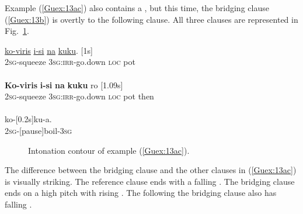 \documentclass[output=paper]{LSP/langsci}
\begin{document}
Example (\ref{Guex:13ac}) also contains a , but this time, the bridging clause (\ref{Guex:13b}) is overtly  to the following clause. All three clauses are represented in Fig.~\ref{GuF3}. 

\begin{exe}
\ex \label{Guex:13ac}
\begin{xlist}
\ex \label{Guex:13a}
\gll \underline{ko-viris}          \underline{i-si}                 \underline{na}     \underline{kuku}. [1s]\\
\textsc{2sg}-squeeze     \textsc{3sg:irr-}go.down   \textsc{loc}    pot \\
\glt {}\\
\ex \label{Guex:13b}
\gll \textbf{Ko-viris}          \textbf{i-si}               \textbf{na}    \textbf{kuku}   ro [1.09s] \\
\textsc{2sg}-squeeze     \textsc{3sg:irr-}go.down   \textsc{loc}    pot then\\
\glt {}\\
\ex \label{Guex:13c}
\gll   ko-[0.2s]ku-a.\\     	       
\textsc{2sg}-[pause]boil-\textsc{3sg}\\
\glt {} 
\end{xlist}
\end{exe}

\begin{figure}[ht]
\caption{Intonation contour of example (\ref{Guex:13ac}). \label{GuF3}}
\end{figure}

The difference between the bridging clause and the other clauses in (\ref{Guex:13ac}) is visually striking. The reference clause ends with a falling . The bridging clause ends on a high pitch with rising . The  following the bridging clause also has falling . 
\end{document}
